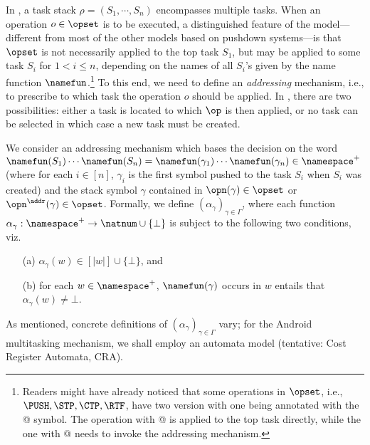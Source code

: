 In \DNSS, a task stack $\rho=(S_1, \cdots, S_n)$ encompasses multiple tasks. When an operation $o \in \opset$ is to be executed, a distinguished feature of the {\DNSS} model---different from most of the other models based on pushdown systems---is that $\opset$ is not necessarily applied to the top task $S_1$, but may be applied to some task $S_i$ for $1<i\leq n$, depending on the names of all $S_i$'s given by the name function $\namefun$.\footnote{Readers might have already noticed that some operations in $\opset$, i.e., $\PUSH, \STP, \CTP, \RTF$, have two version with one being annotated with the @ symbol. The operation with @ is applied to the top task directly, while the one with @ needs to invoke the addressing mechanism.} To this end, we 
need to define an \emph{addressing} mechanism, i.e., to prescribe to which task the operation $o$ should be applied. In \DNSS, there are two possibilities: either a task is located to which $\op$ is then applied, or no task can be selected in which case a new task must be created. 

We consider an addressing mechanism which bases the decision on the word $\namefun(S_1)\cdots \namefun(S_n) = \namefun(\gamma_1)\cdots \namefun(\gamma_n) \in \namespace^+$ (where for each $i \in [n]$, $\gamma_i$ is the first symbol pushed to the task $S_i$ when $S_i$ was created) and the stack symbol $\gamma$ contained in $\opn(\gamma) \in \opset$ or $\opn^\addr(\gamma) \in \opset$. Formally, we define $(\alpha_\gamma)_{\gamma\in \Gamma}$, where %
each function $\alpha_\gamma: \namespace^+\rightarrow \natnum\cup\{\bot\}$  is subject to the following two conditions, viz.  
\begin{itemize} 
	\item[(a)] $\alpha_\gamma(w)\in [|w|]\cup\{\bot\}$,  and 
	\item[(b)] for each $w \in \namespace^+$, $\namefun(\gamma)$ occurs in  $w$ entails that $\alpha_\gamma(w) \neq \bot$. 
\end{itemize}
As mentioned, concrete definitions of $(\alpha_\gamma)_{\gamma\in \Gamma}$ vary; for the Android multitasking mechanism, %
we shall employ an automata model (tentative: Cost Register Automata, CRA). 

